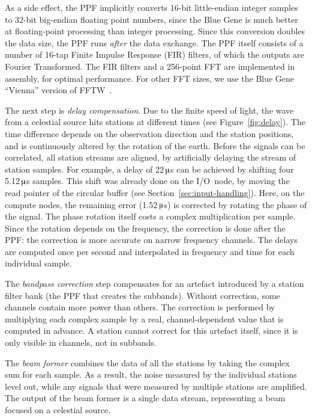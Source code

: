 \documentclass[10pt]{article}
\newcommand{\us}{\,$\muup$s\xspace}
\begin{document}
As a side effect, the PPF implicitly converts 16-bit little-endian integer
samples to 32-bit big-endian floating point numbers, since the Blue Gene is
much better at floating-point processing than integer processing.
Since this conversion doubles the data size, the PPF runs \emph{after\/} the
data exchange.
The PPF itself consists of a number of 16-tap Finite Impulse Response (FIR)
filters, of which the outputs are Fourier Transformed.
The FIR filters and a 256-point FFT are implemented in assembly, for optimal
performance.
For other FFT sizes, we use the Blue Gene ``Vienna'' version of
FFTW~\cite{Lorenz:05}.


The next step is \emph{delay compensation}.
Due to the finite speed of light, the wave from a celestial source hits
stations at different times (see Figure~\ref{fig:delay}).
The time difference depends on the observation direction and the
station positions, and is continuously altered by the rotation of the earth.
Before the signals can be correlated, all station streams are aligned,
by artificially delaying the stream of station samples.
For example, a delay of 22\us can be achieved by shifting four 5.12\us
samples.
This shift was already done on the I/O~node, by moving the read pointer
of the circular buffer (see Section~\ref{sec:input-handling}).
Here, on the compute nodes, the remaining error (1.52\us) is corrected by
rotating the phase of the signal.
The phase rotation itself costs a complex multiplication per sample.
Since the rotation depends on the frequency, the correction is done after 
the PPF: the correction is more accurate on narrow frequency channels.
The delays are computed once per second and interpolated in frequency
and time for each individual sample.

The \emph{bandpass correction} step compensates for an artefact
introduced by a station filter bank (the PPF that creates the subbands).
Without correction, some channels contain more power than others.
The correction is performed by multiplying each complex sample by a real,
channel-dependent value that is computed in advance.
A station cannot correct for this artefact itself, since it is only visible
in channels, not in subbands.

The \emph{beam former} combines the data of all the stations by taking the
complex sum for each sample. As a result, the noise measured by the individual
stations level out, while any signals that were measured by multiple stations
are amplified. The output of the beam former is a single data stream,
representing a beam focused on a celestial source.
\end{document}
